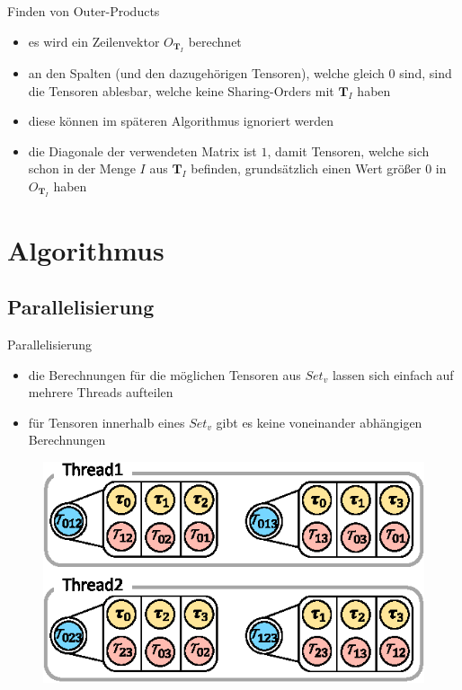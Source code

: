 \documentclass{beamer}
\begin{document}
			\begin{frame}{Finden von Outer-Products}
				\begin{itemize}
					\item es wird ein Zeilenvektor $O_{\bm{T}_I}$ berechnet
					\item an den Spalten (und den dazugehörigen Tensoren), welche gleich $0$ sind, sind die Tensoren ablesbar, welche keine Sharing-Orders mit $\bm{T}_I$ haben
					\item diese können im späteren Algorithmus ignoriert werden \pause
					\item die Diagonale der verwendeten Matrix ist $1$, damit Tensoren, welche sich schon in der Menge $I$ aus $\bm{T}_I$ befinden, grundsätzlich einen Wert größer $0$ in $O_{\bm{T}_I}$ haben
				\end{itemize}
			\end{frame}
	

		\section{Algorithmus}
		\subsection{Parallelisierung}

			\begin{frame}{Parallelisierung}
				\begin{itemize}
					\item die Berechnungen für die möglichen Tensoren aus $Set_v$ lassen sich einfach auf mehrere Threads aufteilen
					\item für Tensoren innerhalb eines $Set_v$ gibt es keine voneinander abhängigen Berechnungen
				\end{itemize}
				\begin{figure}
					\includegraphics{figure_07}
				\end{figure}
			\end{frame}
\end{document}
